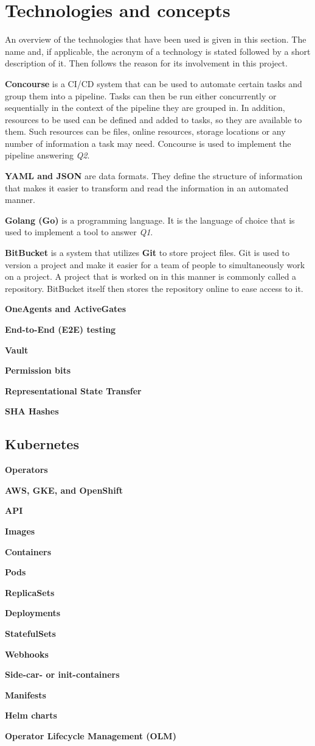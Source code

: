 \chapter{Technologies and concepts}\label{ch:technologies-used}

An overview of the technologies that have been used is given in this section.
The name and, if applicable, the acronym of a technology is stated followed by a short description of it.
Then follows the reason for its involvement in this project.

\textbf{Concourse} is a CI/CD system that can be used to automate certain tasks and group them into a pipeline.
Tasks can then be run either concurrently or sequentially in the context of the pipeline they are grouped in.
In addition, resources to be used can be defined and added to tasks, so they are available to them.
Such resources can be files, online resources, storage locations or any number of information a task may need.
Concourse is used to implement the pipeline answering \textit{Q2}.

\textbf{YAML and JSON} are data formats.
They define the structure of information that makes it easier to transform and read the information in an automated manner.

\textbf{Golang (Go)} is a programming language.
It is the language of choice that is used to implement a tool to answer \textit{Q1}.

\textbf{BitBucket} is a system that utilizes \textbf{Git} to store project files.
Git is used to version a project and make it easier for a team of people to simultaneously work on a project.
A project that is worked on in this manner is commonly called a repository.
BitBucket itself then stores the repository online to ease access to it.

\textbf{OneAgents and ActiveGates}

\textbf{End-to-End (E2E) testing}

\textbf{Vault}

\textbf{Permission bits}

\textbf{Representational State Transfer}

\textbf{SHA Hashes}

\section{Kubernetes}\label{sec:kubernetes}

\textbf{Operators}

\textbf{AWS, GKE, and OpenShift}

\textbf{API}

\textbf{Images}

\textbf{Containers}

\textbf{Pods}

\textbf{ReplicaSets}

\textbf{Deployments}

\textbf{StatefulSets}

\textbf{Webhooks}

\textbf{Side-car- or init-containers}

\textbf{Manifests}

\textbf{Helm charts}

\textbf{Operator Lifecycle Management (OLM)}